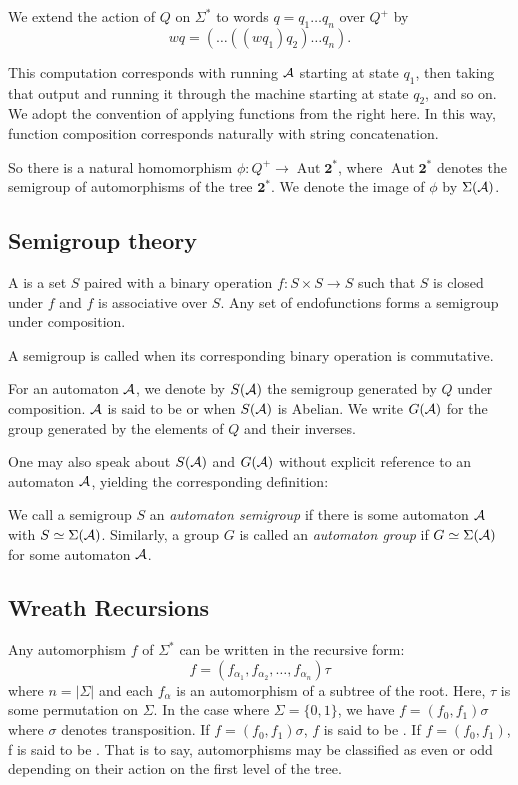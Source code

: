\documentclass[11pt, titlepage]{article}
\begin{document}
We extend the action of $Q$ on $\Sigma^*$ to words $q = q_1\ldots q_n$
over $Q^+$ by \[ wq = (\ldots((w q_1) q_2)\ldots q_n). \]

This computation corresponds with running $\mathcal{A}$ starting at state $q_1$,
then taking that output and running it through the machine starting at
state $q_2$, and so on. We adopt the convention of applying functions
from the right here. In this way, function composition corresponds
naturally with string concatenation.

So there is a natural homomorphism
$\phi : Q^+ \rightarrow \operatorname{Aut}\textbf{2}^*$, where
$\operatorname{Aut}\textbf{2}^*$ denotes the semigroup of automorphisms of the
tree $\textbf{2}^*$. We denote the image of $\phi$ by $\Sigma(\mathcal{A})$.

\subsection*{Semigroup theory}

A  is a set $S$ paired with a binary operation
$f : S \times S \rightarrow S$ such that $S$ is closed under $f$ and
$f$ is associative over $S$. Any set of endofunctions forms a
semigroup under composition.

A semigroup is called  when its corresponding binary
operation is commutative.

For an automaton $\mathcal{A}$, we denote by $S(\mathcal{A})$ the semigroup generated by
$Q$ under composition. $\mathcal{A}$ is said to be  or
 when $S(\mathcal{A})$ is Abelian. We write $G(\mathcal{A})$ for the group
generated by the elements of $Q$ and their inverses.

One may also speak about $S(\mathcal{A})$ and $G(\mathcal{A})$ without explicit reference
to an automaton $\mathcal{A}$, yielding the corresponding definition:
\begin{definition}
  We call a semigroup $S$ an \emph{automaton semigroup} if there is
  some automaton $\mathcal{A}$ with $S \simeq \Sigma(\mathcal{A})$. Similarly, a group
  $G$ is called an \emph{automaton group} if $G \simeq \Sigma(\mathcal{A})$ for
  some automaton $\mathcal{A}$.
\end{definition}

\subsection*{Wreath Recursions}
Any automorphism $f$ of $\Sigma^*$ can be written in the recursive form:
\[ f = (f_{\alpha_1}, f_{\alpha_2}, \ldots, f_{\alpha_n})\tau \] where
$n = |\Sigma|$ and each $f_\alpha$ is an automorphism of a subtree of
the root. Here, $\tau$ is some permutation on $\Sigma$. In the case
where $\Sigma = \{0, 1\}$, we have $f = (f_0, f_1)\sigma$ where
$\sigma$ denotes transposition. If $f = (f_0, f_1)\sigma$, $f$ is said
to be . If $f = (f_0, f_1)$, f is said to be
. That is to say, automorphisms may be classified as even
or odd depending on their action on the first level of the tree.
\end{document}
